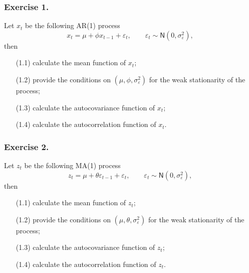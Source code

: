 \documentclass[
paper=128mm:96mm, %
fontsize=9.5pt, %
pagesize, %
parskip=half-, %
]{scrartcl} %
\theoremstyle{mythmstyle} %
\begin{document}
\subsubsection*{Exercise 1.}
Let $x_t$ be the following AR(1) process
%
\begin{equation}
x_t=\mu+\phi x_{t-1}+\varepsilon_{t},\qquad\varepsilon_t\sim\mathsf{N}\left(0,\sigma_\varepsilon^2\right),\nonumber
\end{equation}
then
\begin{itemize}
\item[(1.1)] calculate the mean function of $x_t$;
\item[(1.2)] provide the conditions on $\left(\mu,\phi,\sigma_\varepsilon^2\right)$ for the weak stationarity of the process;
\item[(1.3)] calculate the autocovariance function of $x_t$;
\item[(1.4)] calculate the autocorrelation function of $x_t$.
\end{itemize}

\subsubsection*{Exercise 2.}
Let $z_t$ be the following MA(1) process
%
\begin{equation}
z_t=\mu+\theta \varepsilon_{t-1}+\varepsilon_{t},\qquad\varepsilon_t\sim\mathsf{N}\left(0,\sigma_\varepsilon^2\right),\nonumber
\end{equation}
then
\begin{itemize}
\item[(1.1)] calculate the mean function of $z_t$;
\item[(1.2)] provide the conditions on $\left(\mu,\theta,\sigma_\varepsilon^2\right)$ for the weak stationarity of the process;
\item[(1.3)] calculate the autocovariance function of $z_t$;
\item[(1.4)] calculate the autocorrelation function of $z_t$.
\end{itemize}
\end{document}
